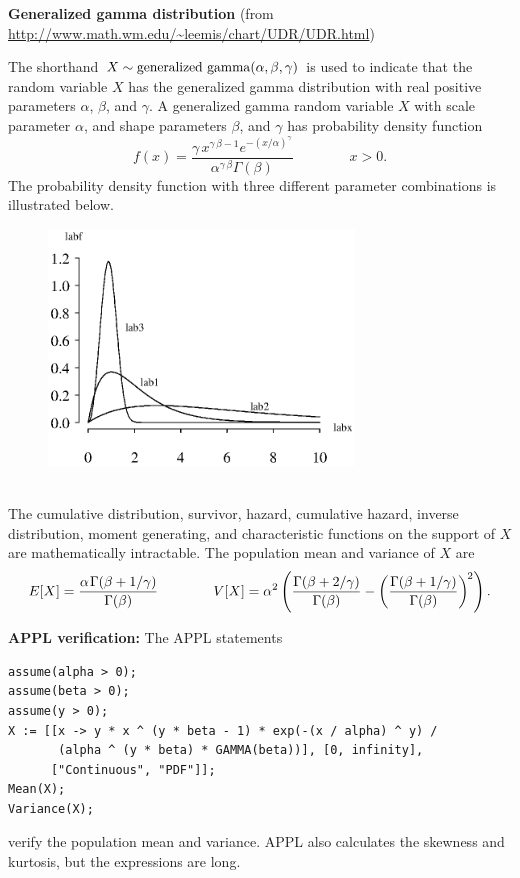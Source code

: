 \documentclass[12pt,fullpage]{article}
\begin{document}
\noindent
{\bf Generalized gamma distribution}  (from \color{blue}\url{http://www.math.wm.edu/~leemis/chart/UDR/UDR.html}\color{black})

\noindent
The shorthand $X \sim {\rm generalized\  gamma}(\alpha, \beta, \gamma)$ is used to indicate that the
random variable $X$ has the generalized gamma distribution with real positive parameters
$\alpha$, $\beta$, and $\gamma$.
A generalized gamma random variable $X$ with scale parameter $\alpha$, and shape parameters
$\beta$, and $\gamma$ has probability density function 
$$
f(x) = \frac{\gamma\,{x}^{\gamma\,{\beta}-1}{e^{- \left( {x/\alpha} \right) ^ \gamma}}}
{{{\alpha}}^{\gamma\,{\beta}} \Gamma \left({\beta} \right)} \qquad \qquad x > 0.
$$
The probability density function with three different parameter combinations is illustrated below.
{\begin{figure}[h!]
\begin{center}
\includegraphics[width=3.2in]{GeneralizedgammaPlot.ps}
\end{center}
\end{figure}}\\
The cumulative distribution, survivor, hazard, cumulative hazard,
inverse distribution, moment generating, and characteristic functions on the support of $X$ are mathematically intractable.
The population mean and variance of $X$ are
$$
E[X] = \frac{\alpha \kern 0.08 em \Gamma(\beta+1/\gamma)}{\Gamma(\beta)} \qquad \qquad 
V[X] = \alpha^2\left(\frac{\Gamma(\beta+2/\gamma)}{\Gamma(\beta)} - \left(\frac{\Gamma(\beta+1/\gamma)}{\Gamma(\beta)}\right)^{\kern -0.08 em 2}\right).
$$

\vspace{0.1in}

\noindent
{\bf APPL verification:}
The APPL statements
\begin{verbatim}
assume(alpha > 0);
assume(beta > 0);
assume(y > 0);
X := [[x -> y * x ^ (y * beta - 1) * exp(-(x / alpha) ^ y) /
       (alpha ^ (y * beta) * GAMMA(beta))], [0, infinity],
      ["Continuous", "PDF"]];
Mean(X);
Variance(X);
\end{verbatim}
verify the population mean and variance.  APPL also calculates the skewness and kurtosis, but
the expressions are long.
\end{document}
